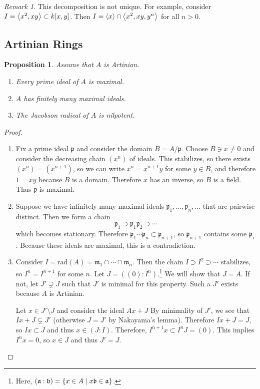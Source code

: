 \documentclass[leqno, openany]{memoir}
\newtheorem{prop}[thm]{Proposition}
\theoremstyle{definition}
\theoremstyle{remark}
\newtheorem{rmk}[thm]{Remark}
\theoremstyle{plain}
\theoremstyle{definition}
\theoremstyle{remark}
\newcommand{\mf}[1]{\mathfrak{#1}}
\newcommand{\mr}[1]{\mathrm{#1}}
\begin{document}
\begin{rmk}
    This decomposition is not unique. For example, consider $I = \ev{ x^2, xy } \subset k[x,y]$. Then $I = \ev{x} \cap \ev{x^2, xy, y^n}$ for all $n > 0$.
\end{rmk}

\subsection{Artinian Rings}%
\label{sub:artinian_rings}

\begin{prop}
    Assume that $A$ is Artinian.
    \begin{enumerate}
        \item Every prime ideal of $A$ is maximal.
        \item $A$ has finitely many maximal ideals.
        \item The Jacobson radical of $A$ is nilpotent.
    \end{enumerate}
\end{prop}

\begin{proof}
    \begin{enumerate}
        \item Fix a prime ideal $\mf{p}$ and consider the domain $B = A / \mf{p}$. Choose $B \ni x \neq 0$ and consider the decreasing chain $(x^n)$ of ideals. This stabilizes, so there exists $(x^n) = (x^{n+1})$, so we can write $x^n = x^{n+1}y$ for some $y \in B$, and therefore $1 = xy$ because $B$ is a domain. Therefore $x$ has an inverse, so $B$ is a field. Thus $\mf{p}$ is maximal.
        \item Suppose we have infinitely many maximal ideals $\mf{p}_1, \ldots, \mf{p}_n, \ldots$ that are pairwise distinct. Then we form a chain
            \[ \mf{p}_1 \supset \mf{p}_1\mf{p}_2 \supset \cdots \]
            which becomes stationary. Therefore $\mf{p}_1 \cdots \mf{p}_n \subset \mf{p}_{n+1}$, so $\mf{p}_{n+1}$ contains some $\mf{p}_i$. Because these ideals are maximal, this is a contradiction.
        \item Consider $I = \mr{rad}(A) = \mf{m}_1 \cap \cdots \cap \mf{m}_n$. Then the chain $I \supset I^2 \supset \cdots$ stabilizes, so $I^n = I^{n+1}$ for some $n$. Let $J = ((0): I^n)$.\footnote{Here, $(\mf{a}: \mf{b}) = \qty{x \in A \mid x\mf{b} \in \mf{a}}$.} We will show that $J = A$. If not, let $J' \supsetneq J$ such that $J'$ is minimal for this property. Such a $J'$ exists because $A$ is Artinian.

            Let $x \in J' \setminus J$ and consider the ideal $Ax + J$ By minimality of $J'$, we see that $Ix + J \subsetneq J'$ (otherwise $J = J'$ by Nakayama's lemma). Therefore $Ix + J = J$, so $Ix \subset J$ and thus $x \in (J:I)$. Therefore, $I^{n+1}x \subset I^n J = (0)$. This implies $I^nx = 0$, so $x \in J$ and thus $J' = J$. \qedhere
    \end{enumerate}
\end{proof}
\end{document}
